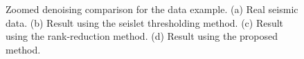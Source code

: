 \begin{figure}[htb!]
	\caption{Zoomed denoising comparison for the  data example. (a) Real seismic data. (b) Result using the seislet thresholding method. (c) Result using the rank-reduction method. (d) Result using the proposed method. }
	\label{fig:real-z}
\end{figure}







